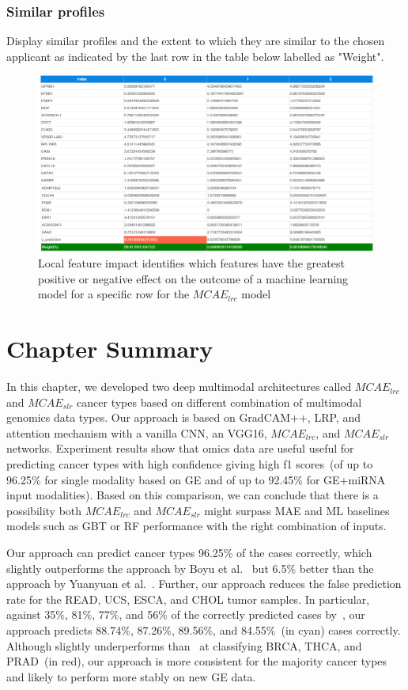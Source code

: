\subsubsection{Similar profiles}
Display similar profiles and the extent to which they are similar to the chosen applicant as indicated by the last row in the table below labelled as "Weight".

\begin{figure}[h]
    \centering
	\includegraphics[scale=0.8]{images/similar_profiles.png}
	\caption{Local feature impact identifies which features have the greatest positive or negative effect on the outcome of a machine learning model for a specific row for the $MCAE_{lrc}$ model}
    \label{fig:local_feature_impacts4}
\end{figure}

\section{Chapter Summary}\label{chapter_5:conclusion}
In this chapter, we developed two deep multimodal architectures called $MCAE_{lrc}$ and $MCAE_{slr}$ cancer types based on different combination of multimodal genomics data types. Our approach is based on GradCAM++, LRP, and attention mechanism with a vanilla CNN, an VGG16, $MCAE_{lrc}$, and $MCAE_{slr}$ networks. Experiment results show that omics data are useful useful for predicting cancer types with high confidence giving high f1 scores~(of up to 96.25\% for single modality based on GE and of up to 92.45\% for GE+miRNA input modalities). Based on this comparison, we can conclude that there is a possibility both $MCAE_{lrc}$ and $MCAE_{slr}$ might surpass MAE and ML baselines models such as GBT or RF performance with the right combination of inputs. 

\hspace*{3.5mm} Our approach can predict cancer types 96.25\% of the cases correctly, which slightly outperforms the approach by Boyu et al.~\cite{lyu2018deep} but 6.5\% better than the approach by Yuanyuan et al.~\cite{li2017comprehensive}. Further, our approach reduces the false prediction rate for the READ, UCS, ESCA, and CHOL tumor samples. In particular, against 35\%, 81\%, 77\%, and 56\% of the correctly predicted cases by~\cite{lyu2018deep}, our approach predicts 88.74\%, 87.26\%, 89.56\%, and 84.55\%~(in cyan) cases correctly. Although slightly underperforms than~\cite{lyu2018deep} at classifying BRCA, THCA, and PRAD~(in red), our approach is more consistent for the majority cancer types and likely to perform more stably on new GE data. 

